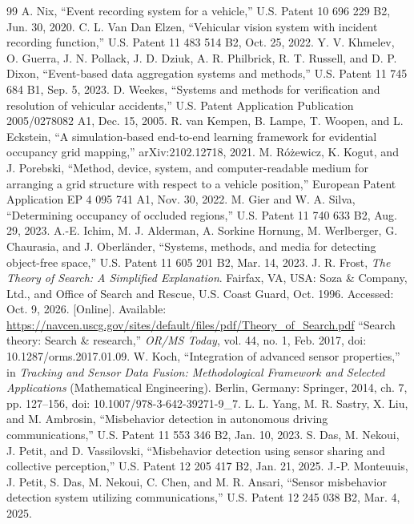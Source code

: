 \begin{thebibliography}{99}
 A. Nix, ``Event recording system for a vehicle,'' U.S. Patent 10 696 229 B2, Jun. 30, 2020.
 C. L. Van Dan Elzen, ``Vehicular vision system with incident recording function,'' U.S. Patent 11 483 514 B2, Oct. 25, 2022.
 Y. V. Khmelev, O. Guerra, J. N. Pollack, J. D. Dziuk, A. R. Philbrick, R. T. Russell, and D. P. Dixon, ``Event-based data aggregation systems and methods,'' U.S. Patent 11 745 684 B1, Sep. 5, 2023.
 D. Weekes, ``Systems and methods for verification and resolution of vehicular accidents,'' U.S. Patent Application Publication 2005/0278082 A1, Dec. 15, 2005.
 R. van Kempen, B. Lampe, T. Woopen, and L. Eckstein, ``A simulation-based end-to-end learning framework for evidential occupancy grid mapping,'' arXiv:2102.12718, 2021.
 M. R\'{o}\.{z}ewicz, K. Kogut, and J. Porebski, ``Method, device, system, and computer-readable medium for arranging a grid structure with respect to a vehicle position,'' European Patent Application EP 4 095 741 A1, Nov. 30, 2022.
 M. Gier and W. A. Silva, ``Determining occupancy of occluded regions,'' U.S. Patent 11 740 633 B2, Aug. 29, 2023.
 A.-E. Ichim, M. J. Alderman, A. Sorkine Hornung, M. Werlberger, G. Chaurasia, and J. Oberl\"{a}nder, ``Systems, methods, and media for detecting object-free space,'' U.S. Patent 11 605 201 B2, Mar. 14, 2023.
 J. R. Frost, \emph{The Theory of Search: A Simplified Explanation}. Fairfax, VA, USA: Soza \& Company, Ltd., and Office of Search and Rescue, U.S. Coast Guard, Oct. 1996. Accessed: Oct. 9, 2026. [Online]. Available: \url{https://navcen.uscg.gov/sites/default/files/pdf/Theory_of_Search.pdf}
 ``Search theory: Search \& research,'' \emph{OR/MS Today}, vol. 44, no. 1, Feb. 2017, doi: 10.1287/orms.2017.01.09.
 W. Koch, ``Integration of advanced sensor properties,'' in \emph{Tracking and Sensor Data Fusion: Methodological Framework and Selected Applications} (Mathematical Engineering). Berlin, Germany: Springer, 2014, ch. 7, pp. 127--156, doi: 10.1007/978-3-642-39271-9\_7.
 L. L. Yang, M. R. Sastry, X. Liu, and M. Ambrosin, ``Misbehavior detection in autonomous driving communications,'' U.S. Patent 11 553 346 B2, Jan. 10, 2023.
 S. Das, M. Nekoui, J. Petit, and D. Vassilovski, ``Misbehavior detection using sensor sharing and collective perception,'' U.S. Patent 12 205 417 B2, Jan. 21, 2025.
 J.-P. Monteuuis, J. Petit, S. Das, M. Nekoui, C. Chen, and M. R. Ansari, ``Sensor misbehavior detection system utilizing communications,'' U.S. Patent 12 245 038 B2, Mar. 4, 2025.

\end{thebibliography}
